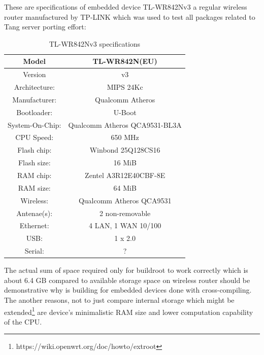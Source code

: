 These are specifications of embedded device TL-WR842Nv3 a regular wireless router manufactured by TP-LINK which was used to test all packages related to Tang server porting effort:

\begin{table}[h]
\centering
\label{routerspec}
\begin{tabular}{c|c}
\hline
Model           &   TL-WR842N(EU)                   \\ \hline
Version         &   v3                              \\ \hline
Architecture:   &   MIPS 24Kc                       \\ \hline
Manufacturer:   &   Qualcomm Atheros                \\ \hline
Bootloader:     &   U-Boot                          \\ \hline
System-On-Chip: &   Qualcomm Atheros QCA9531-BL3A   \\ \hline
CPU Speed:      &   650 MHz                         \\ \hline
Flash chip:     &   Winbond 25Q128CS16              \\ \hline
Flash size:     &   16 MiB                          \\ \hline
RAM chip:       &   Zentel A3R12E40CBF-8E           \\ \hline
RAM size:       &   64 MiB                          \\ \hline
Wireless:       &   Qualcomm Atheros QCA9531        \\ \hline
Antenae(s):     &   2 non-removable                 \\ \hline
Ethernet:       &   4 LAN, 1 WAN 10/100             \\ \hline
USB:            &   1 x 2.0                         \\ \hline
Serial:         &   ?                               \\ \hline
\end{tabular}
\caption{TL-WR842Nv3 specifications}
\end{table}

The actual sum of space required only for buildroot to work correctly which is about 6.4 GB compared to available storage space on wireless router should be demonstrative why is building for embedded devices done with cross-compiling.
The another reasons, not to just compare internal storage which might be extended\footnote{https://wiki.openwrt.org/doc/howto/extroot} are device's minimalistic RAM size and lower computation capability of the CPU.


